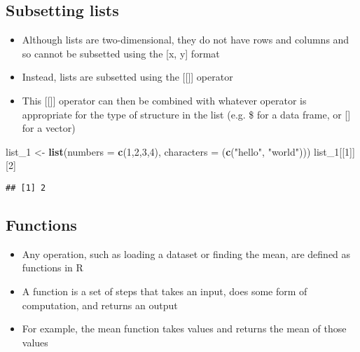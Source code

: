 \documentclass[]{article}
\newenvironment{Shaded}{\begin{snugshade}}{\end{snugshade}}
\newcommand{\KeywordTok}[1]{\textcolor[rgb]{0.13,0.29,0.53}{\textbf{#1}}}
\newcommand{\DataTypeTok}[1]{\textcolor[rgb]{0.13,0.29,0.53}{#1}}
\newcommand{\DecValTok}[1]{\textcolor[rgb]{0.00,0.00,0.81}{#1}}
\newcommand{\StringTok}[1]{\textcolor[rgb]{0.31,0.60,0.02}{#1}}
\newcommand{\NormalTok}[1]{#1}
\providecommand{\tightlist}{%
  \setlength{\itemsep}{0pt}\setlength{\parskip}{0pt}}
\begin{document}
\subsection{Subsetting lists}\label{subsetting-lists-1}

\begin{itemize}
\tightlist
\item
  Although lists are two-dimensional, they do not have rows and columns
  and so cannot be subsetted using the {[}x, y{]} format
\item
  Instead, lists are subsetted using the {[}{[}{]}{]} operator
\item
  This {[}{[}{]}{]} operator can then be combined with whatever operator
  is appropriate for the type of structure in the list (e.g. \$ for a
  data frame, or {[}{]} for a vector)
\end{itemize}

\begin{Shaded}
\begin{Highlighting}[]
\NormalTok{list_}\DecValTok{1}\NormalTok{ <-}\StringTok{ }\KeywordTok{list}\NormalTok{(}\DataTypeTok{numbers =} \KeywordTok{c}\NormalTok{(}\DecValTok{1}\NormalTok{,}\DecValTok{2}\NormalTok{,}\DecValTok{3}\NormalTok{,}\DecValTok{4}\NormalTok{), }\DataTypeTok{characters =}\NormalTok{ (}\KeywordTok{c}\NormalTok{(}\StringTok{"hello"}\NormalTok{, }\StringTok{"world"}\NormalTok{)))}
\NormalTok{list_}\DecValTok{1}\NormalTok{[[}\DecValTok{1}\NormalTok{]][}\DecValTok{2}\NormalTok{]}
\end{Highlighting}
\end{Shaded}

\begin{verbatim}
## [1] 2
\end{verbatim}

\subsection{Functions}\label{functions}

\begin{itemize}
\tightlist
\item
  Any operation, such as loading a dataset or finding the mean, are
  defined as functions in R
\item
  A function is a set of steps that takes an input, does some form of
  computation, and returns an output
\item
  For example, the mean function takes values and returns the mean of
  those values
\end{itemize}
\end{document}
